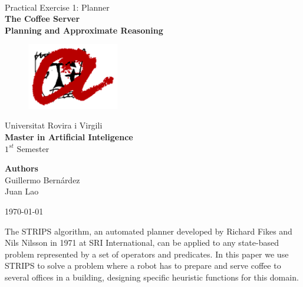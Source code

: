 \documentclass[12pt,a4paper,oneside]{article}
\date{\today}
\numberwithin{equation}{section}
\numberwithin{equation}{section}
\theoremstyle{definition}
\renewenvironment{abstract}
 {\small
  \begin{center}
  \bfseries \abstractname\vspace{-.5em}\vspace{0pt}
  \end{center}
  \list{}{
    \setlength{\leftmargin}{.5cm}%
    \setlength{\rightmargin}{\leftmargin}%
  }%
  \item\relax}
 {\endlist}
\begin{document}
\begin{center}
	\textbf{ }\\[4cm]
	
	\Large Practical Exercise 1: Planner\\[0.5cm]
	\textbf{{\Huge The Coffee Server}}\\[0.5cm]
	\textbf{{\LARGE Planning and Approximate Reasoning}}\\[1.5cm]
	
	\begin{figure}[htb]
		\begin{center}
		\includegraphics[width=4cm]{urvlogo}
		\end{center}
	\end{figure} 
	\vspace*{-0.5cm}
	{\Large Universitat Rovira i Virgili}\\[1.5cm]
	{\LARGE \textbf{Master in Artificial Inteligence}}\\[0.5cm]
	{\LARGE $1^{st}$ Semester}\\[2.5cm]
	
	\begin{flushright}
		\textbf{\large{Authors}}\\ \normalsize{Guillermo Bernárdez\\Juan Lao\\}
	\end{flushright}
	\today
\end{center}
\thispagestyle{empty} 
\pagebreak

\newpage


\vspace*{1cm}
\begin{abstract} The STRIPS algorithm, an automated planner developed by Richard Fikes and Nils Nilsson in 1971 at SRI International, can be applied to any state-based problem represented by a set of operators and predicates. In this paper we use STRIPS to solve a problem where a robot has to prepare and serve coffee to several offices in a building, designing specific heuristic functions for this domain.
\end{abstract}
\vspace*{\fill}
\end{document}
